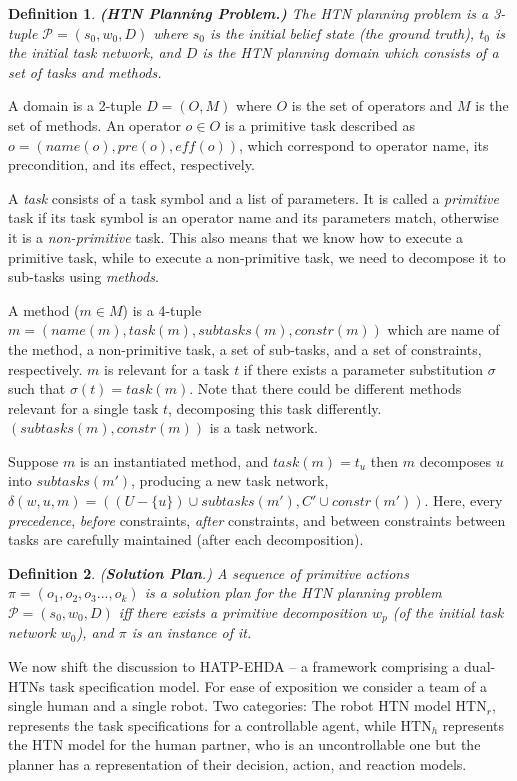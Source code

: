 \documentclass[letterpaper]{article} %
\newtheorem{definition}{Definition}
\begin{document}
\begin{definition}
\textbf{(HTN Planning Problem.)} 
The HTN planning
problem is a 3-tuple $\mathcal{P} = (s_0, w_0, D)$ where $s_0$ is the initial belief state (the ground truth), $t_0$ is the initial task network, and $D$ is the HTN planning domain which consists of a set of tasks and methods.
\end{definition}
A domain is a 2-tuple $D=(O, M)$ where $O$ is the set of operators and $M$ is the set of methods. An operator $o \in O$ is a primitive task described as $o=(name(o), pre(o), \textit{eff}(o))$, which correspond to operator name, its precondition, and its effect, respectively. 

A \textit{task} consists of a task symbol and a list of parameters. It is called a \textit{primitive} task if its task symbol is an operator name and its parameters match, otherwise it is a \textit{non-primitive} task. This also means that we know how to execute a primitive task, while to execute a non-primitive task, we need to decompose it to sub-tasks using \textit{methods}. 

A method ($m \in M$) is a 4-tuple $m=(name(m),task(m),subtasks(m),constr(m))$ which are name of the method, a non-primitive task, a set of sub-tasks, and a set of constraints, respectively. $m$ is relevant for a task $t$ if there exists a parameter substitution $\sigma$ such that $\sigma(t) = task(m)$. Note that there could be different methods relevant for a single task $t$, decomposing this task differently. $(subtasks(m),constr(m))$ is a task network.      

Suppose $m$ is an instantiated method, and $task(m)=t_u$ then $m$ decomposes $u$ into $subtasks(m')$, producing a new task network, $\delta(w,u,m)=((U-\{u\})\cup subtasks(m'),C'\cup constr(m'))$.
Here, every \textit{precedence}, \textit{before} constraints, \textit{after} constraints, and between constraints between tasks are carefully maintained (after each decomposition).

\begin{definition} 
(\textbf{Solution Plan}.) 
{A sequence of primitive actions $\pi=(o_1,o_2,o_3...,o_k)$ is a solution plan for the HTN planning problem $\mathcal{P}=(s_0,w_0,D)$ iff there exists a primitive decomposition $w_p$ (of the initial task network $w_0$), and $\pi$ is an instance of it. 
}  
\end{definition}

We now shift the discussion to HATP-EHDA -- a framework comprising a dual-HTNs task specification model.   
For ease of exposition we consider a team of a single human and a single robot. Two categories: The robot HTN model $\mathrm{HTN}_{r}$, represents the task specifications for a controllable agent, while $\mathrm{HTN}_{h}$ represents the HTN model for the human partner, who is an uncontrollable one but the planner has a
representation of their decision, action, and reaction models. 
\end{document}
